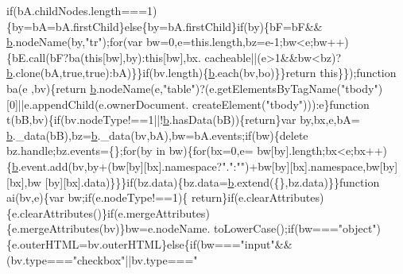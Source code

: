 \begin{DoxyCode}
{      if}(bA.childNodes.length===1)\{by=bA=bA.firstChild\}\textcolor{keywordflow}{else}\{by=bA.firstChild\}\textcolor{keywordflow}{if}(by)\{bF=bF&&
      \hyperlink{a00039_aa4026ad5544b958e54ce5e106fa1c805}{b}.nodeName(by,\textcolor{stringliteral}{"tr"});\textcolor{keywordflow}{for}(var bw=0,e=this.length,bz=e-1;bw<e;bw++)\{bE.call(bF?ba(\textcolor{keyword}{this}[bw],by):\textcolor{keyword}{this}[bw],bx.
      cacheable||(e>1&&bw<bz)?\hyperlink{a00039_aa4026ad5544b958e54ce5e106fa1c805}{b}.clone(bA,\textcolor{keyword}{true},\textcolor{keyword}{true}):bA)\}\}\textcolor{keywordflow}{if}(bv.length)\{\hyperlink{a00039_aa4026ad5544b958e54ce5e106fa1c805}{b}.each(bv,bo)\}\}\textcolor{keywordflow}{return} \textcolor{keyword}{this}\}\});\textcolor{keyword}{function} ba(e
      ,bv)\{\textcolor{keywordflow}{return} \hyperlink{a00039_aa4026ad5544b958e54ce5e106fa1c805}{b}.nodeName(e,\textcolor{stringliteral}{"table"})?(e.getElementsByTagName(\textcolor{stringliteral}{"tbody"})[0]||e.appendChild(e.ownerDocument.
      createElement(\textcolor{stringliteral}{"tbody"}))):e\}\textcolor{keyword}{function} t(bB,bv)\{\textcolor{keywordflow}{if}(bv.nodeType!==1||!\hyperlink{a00039_aa4026ad5544b958e54ce5e106fa1c805}{b}.hasData(bB))\{\textcolor{keywordflow}{return}\}var by,bx,e,bA=
      \hyperlink{a00039_aa4026ad5544b958e54ce5e106fa1c805}{b}.\_data(bB),bz=\hyperlink{a00039_aa4026ad5544b958e54ce5e106fa1c805}{b}.\_data(bv,bA),bw=bA.events;\textcolor{keywordflow}{if}(bw)\{\textcolor{keyword}{delete} bz.handle;bz.events=\{\};\textcolor{keywordflow}{for}(by in bw)\{\textcolor{keywordflow}{for}(bx=0,e=
      bw[by].length;bx<e;bx++)\{\hyperlink{a00039_aa4026ad5544b958e54ce5e106fa1c805}{b}.event.add(bv,by+(bw[by][bx].\textcolor{keyword}{namespace}?\textcolor{stringliteral}{"."}:\textcolor{stringliteral}{""})+bw[by][bx].\textcolor{keyword}{namespace},bw[by][bx],bw
      [by][bx].data)\}\}\}\textcolor{keywordflow}{if}(bz.data)\{bz.data=\hyperlink{a00039_aa4026ad5544b958e54ce5e106fa1c805}{b}.extend(\{\},bz.data)\}\}\textcolor{keyword}{function} ai(bv,e)\{var bw;\textcolor{keywordflow}{if}(e.nodeType!==1)\{\textcolor{keywordflow}{
      return}\}\textcolor{keywordflow}{if}(e.clearAttributes)\{e.clearAttributes()\}\textcolor{keywordflow}{if}(e.mergeAttributes)\{e.mergeAttributes(bv)\}bw=e.nodeName.
      toLowerCase();\textcolor{keywordflow}{if}(bw===\textcolor{stringliteral}{"object"})\{e.outerHTML=bv.outerHTML\}\textcolor{keywordflow}{else}\{\textcolor{keywordflow}{if}(bw===\textcolor{stringliteral}{"input"}&&(bv.type===\textcolor{stringliteral}{"checkbox"}||bv.type===\textcolor{stringliteral}{"
}
\end{DoxyCode}
